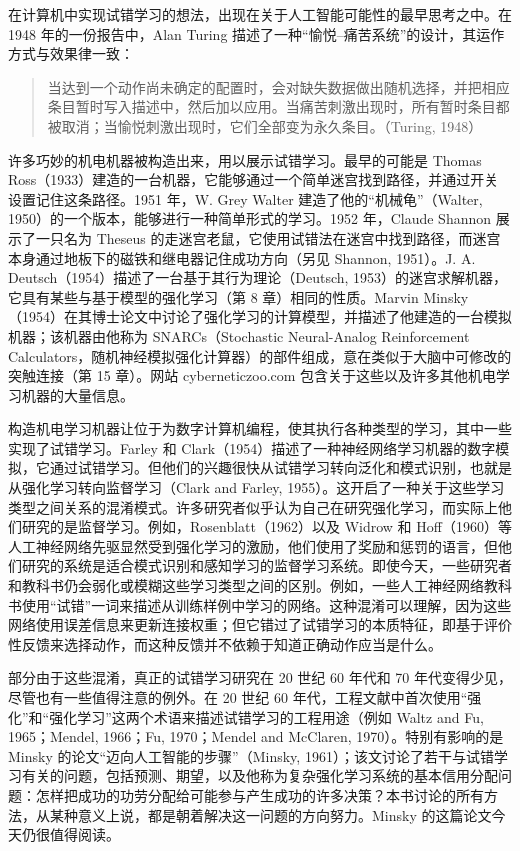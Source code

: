 \documentclass[UTF8,12pt,a4paper,fontset=fandol]{ctexart}
\begin{document}
在计算机中实现试错学习的想法，出现在关于人工智能可能性的最早思考之中。在 1948 年的一份报告中，Alan Turing 描述了一种“愉悦--痛苦系统”的设计，其运作方式与效果律一致：

\begin{quote}
当达到一个动作尚未确定的配置时，会对缺失数据做出随机选择，并把相应条目暂时写入描述中，然后加以应用。当痛苦刺激出现时，所有暂时条目都被取消；当愉悦刺激出现时，它们全部变为永久条目。（Turing, 1948）
\end{quote}

许多巧妙的机电机器被构造出来，用以展示试错学习。最早的可能是 Thomas Ross（1933）建造的一台机器，它能够通过一个简单迷宫找到路径，并通过开关设置记住这条路径。1951 年，W. Grey Walter 建造了他的“机械龟”（Walter, 1950）的一个版本，能够进行一种简单形式的学习。1952 年，Claude Shannon 展示了一只名为 Theseus 的走迷宫老鼠，它使用试错法在迷宫中找到路径，而迷宫本身通过地板下的磁铁和继电器记住成功方向（另见 Shannon, 1951）。J. A. Deutsch（1954）描述了一台基于其行为理论（Deutsch, 1953）的迷宫求解机器，它具有某些与基于模型的强化学习（第 8 章）相同的性质。Marvin Minsky（1954）在其博士论文中讨论了强化学习的计算模型，并描述了他建造的一台模拟机器；该机器由他称为 SNARCs（Stochastic Neural-Analog Reinforcement Calculators，随机神经模拟强化计算器）的部件组成，意在类似于大脑中可修改的突触连接（第 15 章）。网站 cyberneticzoo.com 包含关于这些以及许多其他机电学习机器的大量信息。

构造机电学习机器让位于为数字计算机编程，使其执行各种类型的学习，其中一些实现了试错学习。Farley 和 Clark（1954）描述了一种神经网络学习机器的数字模拟，它通过试错学习。但他们的兴趣很快从试错学习转向泛化和模式识别，也就是从强化学习转向监督学习（Clark and Farley, 1955）。这开启了一种关于这些学习类型之间关系的混淆模式。许多研究者似乎认为自己在研究强化学习，而实际上他们研究的是监督学习。例如，Rosenblatt（1962）以及 Widrow 和 Hoff（1960）等人工神经网络先驱显然受到强化学习的激励，他们使用了奖励和惩罚的语言，但他们研究的系统是适合模式识别和感知学习的监督学习系统。即使今天，一些研究者和教科书仍会弱化或模糊这些学习类型之间的区别。例如，一些人工神经网络教科书使用“试错”一词来描述从训练样例中学习的网络。这种混淆可以理解，因为这些网络使用误差信息来更新连接权重；但它错过了试错学习的本质特征，即基于评价性反馈来选择动作，而这种反馈并不依赖于知道正确动作应当是什么。

部分由于这些混淆，真正的试错学习研究在 20 世纪 60 年代和 70 年代变得少见，尽管也有一些值得注意的例外。在 20 世纪 60 年代，工程文献中首次使用“强化”和“强化学习”这两个术语来描述试错学习的工程用途（例如 Waltz and Fu, 1965；Mendel, 1966；Fu, 1970；Mendel and McClaren, 1970）。特别有影响的是 Minsky 的论文“迈向人工智能的步骤”（Minsky, 1961）；该文讨论了若干与试错学习有关的问题，包括预测、期望，以及他称为复杂强化学习系统的基本信用分配问题：怎样把成功的功劳分配给可能参与产生成功的许多决策？本书讨论的所有方法，从某种意义上说，都是朝着解决这一问题的方向努力。Minsky 的这篇论文今天仍很值得阅读。
\end{document}

